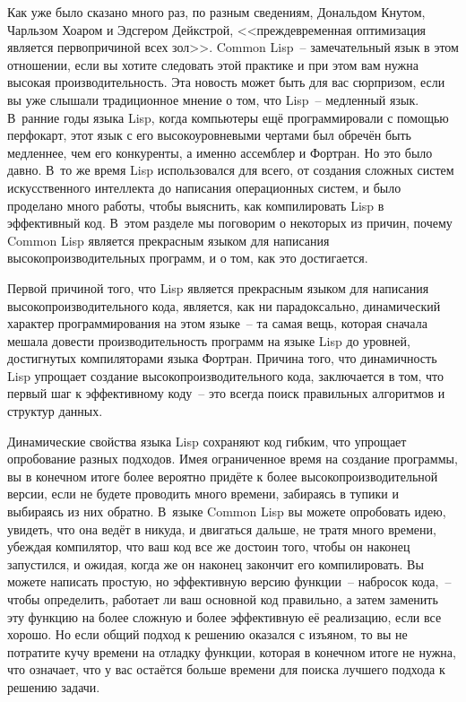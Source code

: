 Как уже было сказано много раз, по разным сведениям, Дональдом Кнутом, Чарльзом Хоаром и
Эдсгером Дейкстрой, <<преждевременная оптимизация является первопричиной всех
зол>>. Common Lisp~-- замечательный язык в этом
отношении, если вы хотите следовать этой практике и при этом вам нужна высокая
производительность. Эта новость может быть для вас сюрпризом, если вы уже слышали
традиционное мнение о том, что Lisp~-- медленный язык. В~ранние годы языка Lisp, когда
компьютеры ещё программировали с помощью перфокарт, этот язык с его высокоуровневыми
чертами был обречён быть медленнее, чем его конкуренты, а именно ассемблер и Фортран. Но
это было давно. В~то же время Lisp использовался для всего, от создания сложных систем
искусственного интеллекта до написания операционных систем, и было проделано много
работы, чтобы выяснить, как компилировать Lisp в эффективный код.  В~этом разделе мы
поговорим о некоторых из причин, почему Common Lisp является прекрасным языком для
написания высокопроизводительных программ, и о том, как это достигается.

Первой причиной того, что Lisp является прекрасным языком для написания
высокопроизводительного кода, является, как ни парадоксально, динамический характер
программирования на этом языке~-- та самая вещь, которая сначала мешала довести
производительность программ на языке Lisp до уровней, достигнутых компиляторами языка
Фортран. Причина того, что динамичность Lisp упрощает создание высокопроизводительного
кода, заключается в том, что первый шаг к эффективному коду~-- это всегда поиск
правильных алгоритмов и структур данных.

Динамические свойства языка Lisp сохраняют код гибким, что упрощает опробование разных
подходов. Имея ограниченное время на создание программы, вы в конечном итоге более
вероятно придёте к более высокопроизводительной версии, если не будете проводить много
времени, забираясь в тупики и выбираясь из них обратно. В~языке Common Lisp вы можете
опробовать идею, увидеть, что она ведёт в никуда, и двигаться дальше, не тратя много
времени, убеждая компилятор, что ваш код все же достоин того, чтобы он наконец запустился,
и ожидая, когда же он наконец закончит его компилировать. Вы можете написать простую, но
эффективную версию функции~-- набросок кода,~-- чтобы определить, работает ли ваш
основной код правильно, а затем заменить эту функцию на более сложную и более эффективную
её реализацию, если все хорошо. Но если общий подход к решению оказался с изъяном, то вы
не потратите кучу времени на отладку функции, которая в конечном итоге не нужна, что
означает, что у вас остаётся больше времени для поиска лучшего подхода к решению задачи.

